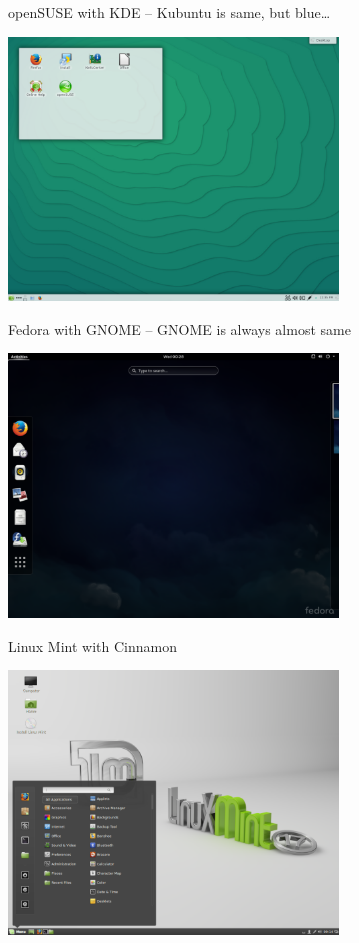 \documentclass[compress, ucs, xelatex, 11pt, xcolor=svgnames,
  hyperref={
    bookmarks=true,
    unicode=true,
    colorlinks=true,
    pdftitle={Linux, command line and MetaCentrum},
    plainpages=false,
    pdfauthor={Vojtech Zeisek},
    pdfsubject={Course about use of Linux command line, writing shell scripts and using MetaCentrum of CESNET},
    pdfcreator={XeLaTeX},
    pdfkeywords={Linux, GNU, BASH, shell, command line, MetaCentrum},
    linkcolor=DarkRed,
    anchorcolor=DarkBlue,
    citecolor=Indigo,
    filecolor=NavyBlue,
    menucolor=DarkMagenta,
    urlcolor=DarkBlue,
    pdftex},
  url={hyphens, lowtilde} %
  ]{beamer}
\begin{document}
\begin{frame}{openSUSE with KDE -- Kubuntu is same, but blue\ldots}
  \begin{center}
    \includegraphics[height=7cm]{opensuse.png}
  \end{center}
\end{frame}

\begin{frame}{Fedora with GNOME -- GNOME is always almost same}
  \begin{center}
    \includegraphics[height=7cm]{fedora.png}
  \end{center}
\end{frame}

\begin{frame}{Linux Mint with Cinnamon}
  \begin{center}
    \includegraphics[height=7cm]{mint.png}
  \end{center}
\end{frame}
\end{document}
